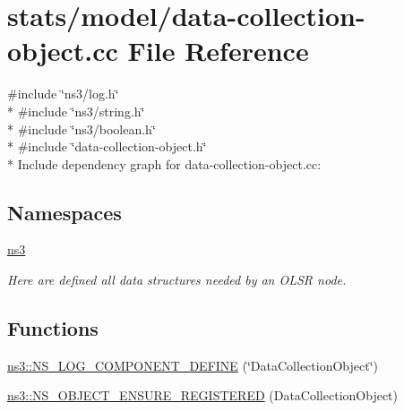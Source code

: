 \hypertarget{data-collection-object_8cc}{}\section{stats/model/data-\/collection-\/object.cc File Reference}
\label{data-collection-object_8cc}
{\ttfamily \#include \char`\"{}ns3/log.\+h\char`\"{}}\\*
{\ttfamily \#include \char`\"{}ns3/string.\+h\char`\"{}}\\*
{\ttfamily \#include \char`\"{}ns3/boolean.\+h\char`\"{}}\\*
{\ttfamily \#include \char`\"{}data-\/collection-\/object.\+h\char`\"{}}\\*
Include dependency graph for data-\/collection-\/object.cc\+:
\subsection*{Namespaces}
\begin{DoxyCompactItemize}
\item 
 \hyperlink{namespacens3}{ns3}
\begin{DoxyCompactList}\small\item\em Here are defined all data structures needed by an O\+L\+SR node. \end{DoxyCompactList}\end{DoxyCompactItemize}
\subsection*{Functions}
\begin{DoxyCompactItemize}
\item 
\hyperlink{namespacens3_a5b143dace940a785ceeb0659eac980f4}{ns3\+::\+N\+S\+\_\+\+L\+O\+G\+\_\+\+C\+O\+M\+P\+O\+N\+E\+N\+T\+\_\+\+D\+E\+F\+I\+NE} (\char`\"{}Data\+Collection\+Object\char`\"{})
\item 
\hyperlink{namespacens3_a404cda919e9f91f87d716c0715fd101d}{ns3\+::\+N\+S\+\_\+\+O\+B\+J\+E\+C\+T\+\_\+\+E\+N\+S\+U\+R\+E\+\_\+\+R\+E\+G\+I\+S\+T\+E\+R\+ED} (Data\+Collection\+Object)
\end{DoxyCompactItemize}
